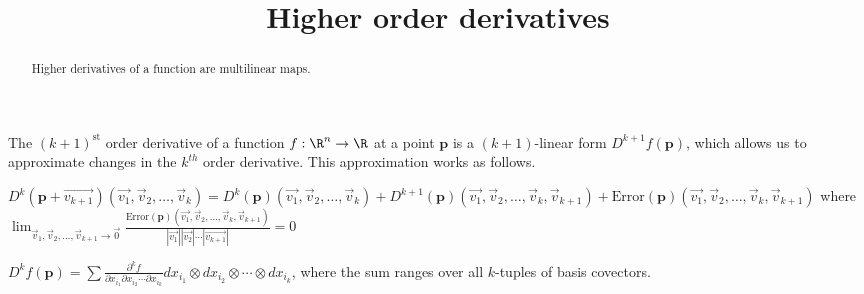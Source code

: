 \documentclass{ximera}
\title{Higher order derivatives}
\begin{document}
\begin{abstract}
  Higher derivatives of a function are multilinear maps.
\end{abstract}\maketitle

The $(k+1)^{\text{st}}$ order derivative of a function $f: \R^n \to \R$  at a point $\mathbf{p}$ is a $(k+1)$-linear form  $D^{k+1} f(\mathbf{p})$,
which allows us to approximate changes in the $k^{th}$ order derivative.  This approximation works as follows.

\begin{definition}
  $D^k(\mathbf{p} + \vec{v_{k+1}})(\vec{v_1},\vec{v}_2,\ldots,\vec{v}_k)  = 
  D^k(\mathbf{p})(\vec{v_1},\vec{v}_2,\ldots,\vec{v}_k) + D^{k+1}(\mathbf{p})(\vec{v_1},\vec{v}_2,\ldots,\vec{v}_k,\vec{v}_{k+1})+ 
  \textrm{Error}(\mathbf{p})(\vec{v_1},\vec{v}_2,\ldots,\vec{v}_k,\vec{v}_{k+1})$ where 
  \(
  \displaystyle\lim_{\vec{v}_1,\vec{v}_2,\ldots,\vec{v}_{k+1} \to \vec{0} } 
  \frac{\textrm{Error}(\mathbf{p})(\vec{v_1},\vec{v}_2,\ldots,\vec{v}_k,\vec{v}_{k+1})}{|\vec{v_1}||\vec{v_2}|\cdots|\vec{v_{k+1}}|} = 0
  \)
\end{definition}

\begin{theorem}
  $D^kf(\mathbf{p}) = \sum \frac{\partial^kf}{\partial x_{i_1} \partial x_{i_2} \cdots \partial x_{i_k}} dx_{i_1} \otimes dx_{i_2} \otimes \cdots \otimes dx_{i_k}$, where the sum ranges 
  over all $k$-tuples of basis covectors.
\end{theorem}
\end{document}
